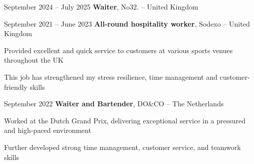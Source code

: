	\begin{twocolentry}{
		September 2024 – July 2025
	}
	\textbf{Waiter}, No32. -- United Kingdom\end{twocolentry}

	\vspace{0.10 cm}
	\begin{onecolentry}
		\begin{highlights}
			\item 
			\item 
			\item 
		\end{highlights}
	\end{onecolentry}
	
	\vspace{0.2 cm}
	
	\begin{twocolentry}{
			September 2021 – June 2023
		}
		\textbf{All-round hospitality worker}, Sodexo -- United Kingdom
	\end{twocolentry}
	
	\vspace{0.10 cm}
	\begin{onecolentry}
		\begin{highlights}
			\item Provided excellent and quick service to customers at various sports venues throughout the UK
			\item This job has strengthened my stress resilience, time management and customer-friendly skills
		\end{highlights}
	\end{onecolentry}
	
	\vspace{0.2 cm}
	
		\begin{twocolentry}{
			September 2022
		}
		\textbf{Waiter and Bartender}, DO\&CO -- The Netherlands\end{twocolentry}
	
	\vspace{0.10 cm}
	\begin{onecolentry}
		\begin{highlights}
			\item Worked at the Dutch Grand Prix, delivering exceptional service in a pressured and high-paced environment
			\item Further developed strong time management, customer service, and teamwork skills
		\end{highlights}
	\end{onecolentry}
	
